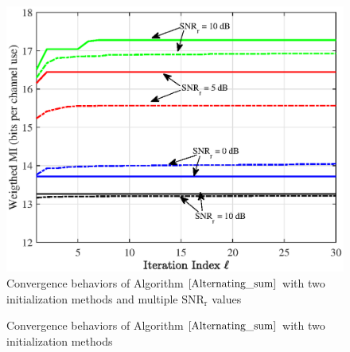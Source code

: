 \documentclass[9pt,journal]{IEEEtran}
\newcommand{\paren}[1]{\left({#1}\right)}
\newcommand{\braces}[1]{{\left\{ {#1}\right\}}}
\newcommand{\HBj}{\mathbf{H}_{\textrm{B},j}}
\newcommand{\HiB}{\mathbf{H}_{i,\textrm{B}}}
\begin{document}
\begin{figure}[t]
	\centering
	\includegraphics[width=1\columnwidth]{tsp_convergence_snr_nolegend.eps}
	\caption{Convergence behaviors of Algorithm $\ref{Alternating_sum}$ with two initialization methods and multiple $\mathrm{SNR}_\textrm{r}$ values}
	\label{fig:convergence}
	\vspace{-1em}
\end{figure}
\iffalse
\begin{figure}[!ht]
\centering
{}
\hfil
{}
\caption{Convergence behaviors of Algorithm $\ref{Alternating_sum}$ with two initialization methods}
\label{fig: convergence}
\vspace{-1em}
\end{figure}
\end{document}
